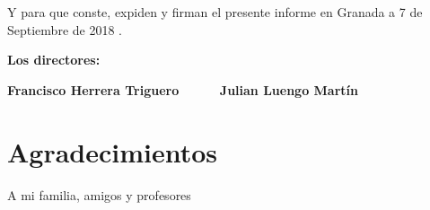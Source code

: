 \vspace{0.5cm}

Y para que conste, expiden y firman el presente informe en Granada a 7 de Septiembre de 2018 .

\vspace{1cm}

\textbf{Los directores:}

\vspace{5cm}

\noindent \textbf{Francisco Herrera Triguero   \ \ \ \ \ Julian Luengo Martín }

\chapter*{Agradecimientos}
\thispagestyle{empty}

       \vspace{1cm}


A mi familia, amigos y profesores

